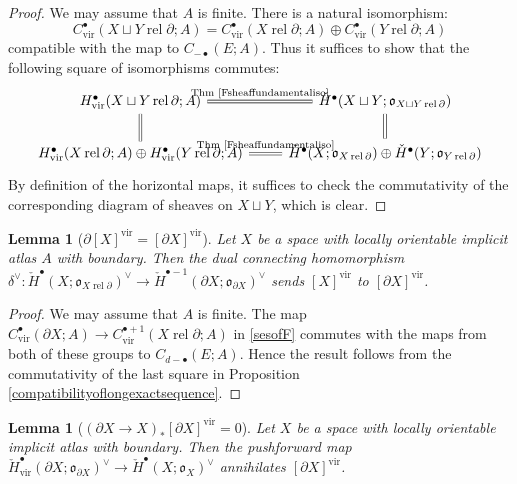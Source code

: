 \documentclass[12pt]{article}
\newtheorem{lemma}[theorem]{Lemma}
\theoremstyle{definition}
\theoremstyle{remark}
\numberwithin{equation}{subsection}
\newcommand{\oo}{\mathfrak o}
\newcommand{\cH}{\check H}
\newcommand{\vir}{\mathrm{vir}}
\newcommand{\rel}{\operatorname{rel}}
\begin{document}
\begin{proof}
We may assume that $A$ is finite.  There is a natural isomorphism:
\begin{equation}
C^\bullet_\vir(X\sqcup Y\rel\partial;A)=C^\bullet_\vir(X\rel\partial;A)\oplus C^\bullet_\vir(Y\rel\partial;A)
\end{equation}
compatible with the map to $C_{-\bullet}(E;A)$.  Thus it suffices to show that the following square of isomorphisms commutes:
\begin{equation}
\begin{tikzcd}
H^\bullet_\vir(X\sqcup Y\rel\partial;A)\ar[equal]{d}\ar[equal]{r}{\text{Thm \ref{Fsheaffundamentaliso}}}&\cH^\bullet(X\sqcup Y;\oo_{X\sqcup Y\rel\partial})\ar[equal]{d}\\
H^\bullet_\vir(X\rel\partial;A)\oplus H^\bullet_\vir(Y\rel\partial;A)\ar[equal]{r}{\text{Thm \ref{Fsheaffundamentaliso}}}&\cH^\bullet(X;\oo_{X\rel\partial})\oplus\cH^\bullet(Y;\oo_{Y\rel\partial})
\end{tikzcd}
\end{equation}
By definition of the horizontal maps, it suffices to check the commutativity of the corresponding diagram of sheaves on $X\sqcup Y$, which is clear.
\end{proof}

\begin{lemma}[{$\partial[X]^\vir=[\partial X]^\vir$}]\label{boundaryfundamentalclass}
Let $X$ be a space with locally orientable implicit atlas $A$ with boundary.  Then the dual connecting homomorphism $\delta^\vee:\cH^\bullet(X;\oo_{X\rel\partial})^\vee\to\cH^{\bullet-1}(\partial X;\oo_{\partial X})^\vee$ sends $[X]^\vir$ to $[\partial X]^\vir$.
\end{lemma}

\begin{proof}
We may assume that $A$ is finite.  The map $C^\bullet_\vir(\partial X;A)\to C^{\bullet+1}_\vir(X\rel\partial;A)$ in \eqref{sesofF} commutes with the maps from both of these groups to $C_{d-\bullet}(E;A)$.  Hence the result follows from the commutativity of the last square in Proposition \ref{compatibilityoflongexactsequence}.
\end{proof}

\begin{lemma}[{$(\partial X\to X)_\ast[\partial X]^\vir=0$}]\label{cobordismworks}
Let $X$ be a space with locally orientable implicit atlas with boundary.  Then the pushforward map $\cH^\bullet_\vir(\partial X;\oo_{\partial X})^\vee\to\cH^\bullet(X;\oo_X)^\vee$ annihilates $[\partial X]^\vir$.
\end{lemma}
\end{document}
